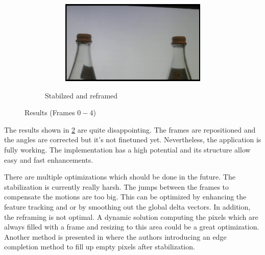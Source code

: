 \begin{figure}[!tbp]
\begin{subfigure}[b]{\textwidth}
\begin{subfigure}[b]{0.180\textwidth}
        \end{subfigure}
        \begin{subfigure}[b]{0.180\textwidth}%
          \includegraphics[width=1\linewidth]{images/results/poststab-4.jpg}
        \end{subfigure}
    \caption{Stabilzed and reframed}
    \label{fig:results}
    \end{subfigure}
    \caption{Results (Frames $0-4$)}
\end{figure}

The results shown in \cref{fig:results} are quite disappointing. The frames are repositioned and the angles are corrected but it's not finetuned yet. Nevertheless, the application is fully working. The implementation has a high potential and its structure allow easy and fast enhancements.

There are multiple optimizations which should be done in the future. The stabilization is currently really harsh. The jumps between the frames to compensate the motions are too big. This can be optimized by enhancing the feature tracking and or by smoothing out the global delta vectors.
In addition, the reframing is not optimal. A dynamic solution computing the pixels which are always filled with a frame and resizing to this area could be a great optimization. Another method is presented in \cite{blockTang} where the authors introducing an edge completion method to fill up empty pixels after stabilization.



